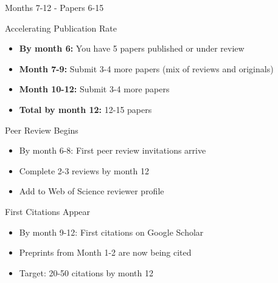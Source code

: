 \documentclass[11pt]{beamer}
\begin{document}
	\begin{frame}{Months 7-12 - Papers 6-15}
		\scriptsize
		\begin{block}{Accelerating Publication Rate}
			\begin{itemize}
				\item \textbf{By month 6:} You have 5 papers published or under review
				\item \textbf{Month 7-9:} Submit 3-4 more papers (mix of reviews and originals)
				\item \textbf{Month 10-12:} Submit 3-4 more papers
				\item \textbf{Total by month 12:} 12-15 papers
			\end{itemize}
		\end{block}
		\begin{block}{Peer Review Begins}
			\begin{itemize}
				\item By month 6-8: First peer review invitations arrive
				\item Complete 2-3 reviews by month 12
				\item Add to Web of Science reviewer profile
			\end{itemize}
		\end{block}
		\begin{block}{First Citations Appear}
			\begin{itemize}
				\item By month 9-12: First citations on Google Scholar
				\item Preprints from Month 1-2 are now being cited
				\item Target: 20-50 citations by month 12
			\end{itemize}
		\end{block}
	\end{frame}
	
\end{document}
